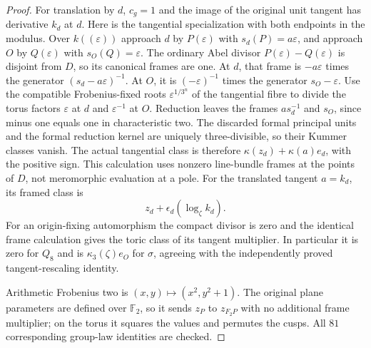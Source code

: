 \begin{proof}
For translation by $d$, $c_g=1$ and the image of the
original unit tangent has derivative $k_d$ at $d$.
Here is the tangential specialization with both endpoints
in the modulus. Over $k((\varepsilon))$ approach $d$ by
$P(\varepsilon)$ with $s_d(P)=a\varepsilon$, and approach
$O$ by $Q(\varepsilon)$ with $s_O(Q)=\varepsilon$.
The ordinary Abel divisor $P(\varepsilon)-Q(\varepsilon)$
is disjoint from $D$, so its canonical frames are one.
At $d$, that frame is $-a\varepsilon$ times the generator
$(s_d-a\varepsilon)^{-1}$. At $O$, it is
$(-\varepsilon)^{-1}$ times the generator
$s_O-\varepsilon$.
Use the compatible Frobenius-fixed roots
$\varepsilon^{1/3^n}$ of the tangential fibre to divide
the torus factors $\varepsilon$ at $d$ and
$\varepsilon^{-1}$ at $O$.
Reduction leaves the frames $a s_d^{-1}$ and $s_O$,
since minus one equals one in characteristic two.
The discarded formal principal units and the formal
reduction kernel are uniquely three-divisible, so their
Kummer classes vanish. The actual tangential class is
therefore $\kappa(z_d)+\kappa(a)e_d$, with the positive
sign. This calculation uses nonzero line-bundle frames
at the points of $D$, not meromorphic evaluation at a pole.
For the translated tangent $a=k_d$, its framed class is
\[
                         z_d+\epsilon_d(\log_\zeta k_d).
                                                               \tag{B.36.9}
\]
For an origin-fixing automorphism the compact divisor
is zero and the identical frame calculation gives the
toric class of its tangent multiplier.  In particular
it is zero for $Q_8$ and is
$\kappa_3(\zeta)e_O$ for $\sigma$, agreeing with
the independently proved tangent-rescaling identity.

Arithmetic Frobenius two is $(x,y)\mapsto(x^2,y^2+1)$.
The original plane parameters are defined over
$\mathbb F_2$, so it sends $z_P$ to $z_{F_2P}$ with
no additional frame multiplier; on the torus it squares
the values and permutes the cusps.
All $81$ corresponding group-law identities are checked.


\end{proof}
